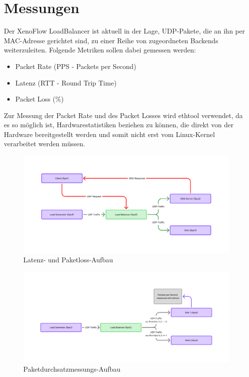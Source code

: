 \section{Messungen}
Der XenoFlow LoadBalancer ist aktuell in der Lage, UDP-Pakete, die an ihn per MAC-Adresse gerichtet sind, zu einer Reihe von zugeordneten Backends weiterzuleiten. Folgende Metriken sollen dabei gemessen werden: 
\begin{itemize}
    \item Packet Rate (PPS - Packets per Second)
    \item Latenz (RTT - Round Trip Time)
    \item Packet Loss (\%)
\end{itemize}
Zur Messung der Packet Rate und des Packet Losses wird ethtool verwendet, da es so möglich ist, Hardwarestatistiken beziehen zu können, die direkt von der Hardware bereitgestellt werden und somit nicht erst vom Linux-Kernel verarbeitet werden müssen.
\begin{figure}
    \centering
    \includegraphics[width=1\linewidth]{images/Messaufbau Latenz.png}
    \caption{Latenz- und Paketloss-Aufbau}
    \label{fig:enter-label}
\end{figure}
\begin{figure}
    \centering
    \includegraphics[width=1\linewidth]{images/Messaufbau PPS.png}
    \caption{Paketdurchsatzmessungs-Aufbau}
    \label{fig:enter-label}
\end{figure}
